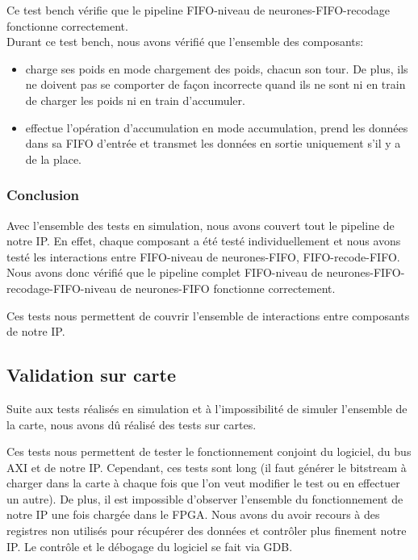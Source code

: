 Ce test bench vérifie que le pipeline FIFO-niveau de neurones-FIFO-recodage
fonctionne correctement.\\

Durant ce test bench, nous avons vérifié que l'ensemble des composants:
\begin{itemize}
	\item charge ses poids en mode chargement des poids, chacun son tour.
	De plus, ils ne doivent pas se comporter de façon incorrecte quand
	ils ne sont ni en train de charger les poids ni en train d'accumuler.
	\item effectue l'opération d'accumulation en mode accumulation, prend
	les données dans sa FIFO d'entrée et transmet les données en sortie
	uniquement s'il y a de la place.
\end{itemize}

\subsubsection{Conclusion}

Avec l'ensemble des tests en simulation, nous avons couvert tout le pipeline de
notre IP. En effet, chaque composant a été testé individuellement et nous avons
testé les interactions entre FIFO-niveau de neurones-FIFO, FIFO-recode-FIFO.
Nous avons donc vérifié que le pipeline complet
FIFO-niveau de neurones-FIFO-recodage-FIFO-niveau de neurones-FIFO fonctionne
correctement.

Ces tests nous permettent de couvrir l'ensemble de interactions entre composants
de notre IP.

\subsection{Validation sur carte}

Suite aux tests réalisés en simulation et à l'impossibilité de simuler
l'ensemble de la carte, nous avons dû réalisé des tests sur cartes.

Ces tests nous permettent de tester le fonctionnement conjoint du logiciel, du
bus AXI et de notre IP. Cependant, ces tests sont long (il faut générer le
bitstream à charger dans la carte à chaque fois que l'on veut modifier le test ou
en effectuer un autre). De plus, il est impossible d'observer l'ensemble du
fonctionnement de notre IP une fois chargée dans le FPGA. Nous avons du avoir
recours à des registres non utilisés pour récupérer des données et contrôler
plus finement notre IP. Le contrôle et le débogage du logiciel se fait via GDB.

